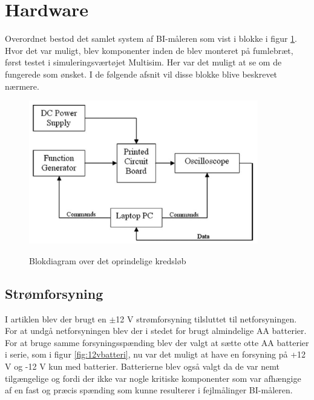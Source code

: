 \section{Hardware}

Overordnet bestod det samlet system af BI-måleren som vist i blokke i figur \ref{fig:oprindeligebd}. Hvor det var muligt, blev komponenter inden de blev monteret på fumlebræt, først testet i simuleringsværtøjet Multisim. Her var det muligt at se om de fungerede som ønsket. I de følgende afsnit vil disse blokke blive beskrevet nærmere. 

\begin{figure}[H]
\centering
{\includegraphics[width=10cm]
{Figure/oprindeligebd}}
\caption{Blokdiagram over det oprindelige kredsløb\cite{Aroom2009}}
\label{fig:oprindeligebd}
\end{figure}

\subsection{Strømforsyning}
I artiklen \citep{Aroom2009}  blev der brugt en $\pm$12 V strømforsyning tilsluttet til netforsyningen. For at undgå netforsyningen blev der i stedet for brugt almindelige AA batterier. For at bruge samme forsyningsspænding blev der valgt at sætte otte AA batterier i serie, som i figur \ref{fig:12vbatteri}, nu var det muligt at have en forsyning på +12 V og -12 V kun med batterier. Batterierne blev også valgt da de var nemt tilgængelige og fordi der ikke var nogle kritiske komponenter som var afhængige af en fast og præcis spænding som kunne resulterer i fejlmålinger BI-måleren. 

